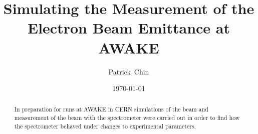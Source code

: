 \documentclass[5p,twocolumn,sort&compress]{elsarticle}
\title{Simulating the Measurement of the\\Electron Beam Emittance at AWAKE}
\author{Patrick~Chin}
\date{\today}
\begin{document}


\begin{frontmatter}
	\begin{abstract}
		In preparation for runs at AWAKE in CERN simulations of the beam
		and measurement of the beam with the spectrometer were carried out
		in order to find how the spectrometer behaved under changes to
		experimental parameters.
	\end{abstract}

\end{frontmatter}










% 



\end{document}
